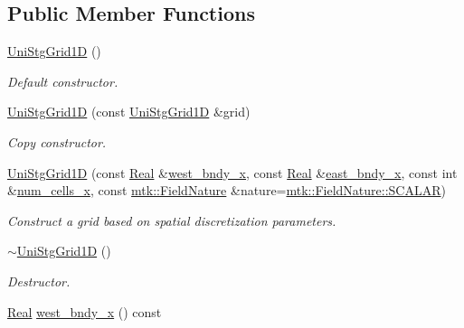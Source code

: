 \subsection*{Public Member Functions}
\begin{DoxyCompactItemize}
\item 
\hyperlink{classmtk_1_1UniStgGrid1D_ab0c1bb8afad2420fdb4434eb21bdec82}{Uni\+Stg\+Grid1\+D} ()
\begin{DoxyCompactList}\small\item\em Default constructor. \end{DoxyCompactList}\item 
\hyperlink{classmtk_1_1UniStgGrid1D_a56d698e803070d96601b46f470bfef0b}{Uni\+Stg\+Grid1\+D} (const \hyperlink{classmtk_1_1UniStgGrid1D}{Uni\+Stg\+Grid1\+D} \&grid)
\begin{DoxyCompactList}\small\item\em Copy constructor. \end{DoxyCompactList}\item 
\hyperlink{classmtk_1_1UniStgGrid1D_aa9b9db169c6e052e6fd6ffd6fca36646}{Uni\+Stg\+Grid1\+D} (const \hyperlink{group__c01-roots_gac080bbbf5cbb5502c9f00405f894857d}{Real} \&\hyperlink{classmtk_1_1UniStgGrid1D_afab51be12598704d2dd6d760f826669b}{west\+\_\+bndy\+\_\+x}, const \hyperlink{group__c01-roots_gac080bbbf5cbb5502c9f00405f894857d}{Real} \&\hyperlink{classmtk_1_1UniStgGrid1D_a3b413aeadcc3d3263f6817f3af1dee95}{east\+\_\+bndy\+\_\+x}, const int \&\hyperlink{classmtk_1_1UniStgGrid1D_af1b3729d8afa07be5b2775ed68015b80}{num\+\_\+cells\+\_\+x}, const \hyperlink{group__c02-enums_ga4c54f2a329cfb4e56213b02a259d19e2}{mtk\+::\+Field\+Nature} \&nature=\hyperlink{namespacemtk_ga4c54f2a329cfb4e56213b02a259d19e2a8f3d9a4b6a7b7f2c7afa61ca113d0db9}{mtk\+::\+Field\+Nature\+::\+S\+C\+A\+L\+A\+R})
\begin{DoxyCompactList}\small\item\em Construct a grid based on spatial discretization parameters. \end{DoxyCompactList}\item 
\hyperlink{classmtk_1_1UniStgGrid1D_a609a8793d238d241f9b11c3afed8d24d}{$\sim$\+Uni\+Stg\+Grid1\+D} ()
\begin{DoxyCompactList}\small\item\em Destructor. \end{DoxyCompactList}\item 
\hyperlink{group__c01-roots_gac080bbbf5cbb5502c9f00405f894857d}{Real} \hyperlink{classmtk_1_1UniStgGrid1D_afab51be12598704d2dd6d760f826669b}{west\+\_\+bndy\+\_\+x} () const 

\end{DoxyCompactItemize}

